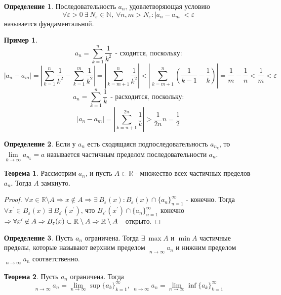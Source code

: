 \documentclass[a4paper, 12pt]{article}
\newcommand{\N}{\mathbb{N}}
\newcommand{\R}{\mathbb{R}}
\renewcommand{\epsilon}{\varepsilon}
\newcommand{\lims}{\lim\limits_{n\to \infty}}
\DeclareMathOperator*\lowlim{\underline{lim}}
\DeclareMathOperator*\uplim{\overline{lim}}
\theoremstyle{definition}
\newtheorem*{definition}{Определение}
\newtheorem*{theorem}{Теорема}
\newtheorem*{example}{Пример}
\begin{document}
        \begin{definition}
            Последовательность $a_n$, удовлетворяющая условию
            \[\forall \epsilon>0\ \exists\ N_{\epsilon}\in \N,\ \forall n,m>N_{\epsilon}: |a_n-a_m|<\epsilon\]
            называется фундаментальной.
        \end{definition} 
        \begin{example}
                \[a_n=\sum\limits_{k=1}^n\frac{1}{k^2}\ \ \text{- сходится, поскольку:}\] 
                \[|a_n-a_m|=|\sum\limits_{k=1}^n\frac{1}{k^2}-\sum\limits_{k=1}^m\frac{1}{k^2}|=|\sum\limits_{k=m+1}^n\frac{1}{k^2}|<|\sum\limits_{k=m+1}^n (\frac{1}{k-1}-\frac{1}{k})|=\frac{1}{m}-\frac{1}{n}<\frac{1}{m}<\epsilon\]
                \[a_n=\sum\limits_{k=1}^n\frac{1}{k}\ \ \text{- расходится, поскольку:}\]
                \[|a_n-a_m|=|\sum\limits_{k=n+1}^{2n}\frac{1}{k}|>\frac{1}{2n}n=\frac{1}{2}\]
        \end{example}
        \begin{definition}
            Если у $a_n$ есть сходящаяся подпоследовательность $a_{n_k}$, то\\ $\lim\limits_{k\to \infty}a_{n_k}=a$ называется частичным пределом последовательности $a_n$.
        \end{definition} 
        \begin{theorem}
            Рассмотрим $a_n$, и пусть $A\subset \R$ - множество всех частичных пределов $a_n$. Тогда $A$ замкнуто.
        \end{theorem} 
        \begin{proof}
            $\forall x\in \R\setminus A \Rightarrow x\not\in A \Rightarrow \exists\ B_{\epsilon}(x): B_{\epsilon}(x)\cap\{a_n\}_{n=1}^{\infty}$ - конечно. Тогда $\forall x^{\prime}\in B_{\epsilon}(x)\ \exists\ B_{\epsilon^{\prime}}(x^{\prime})$, что $B_{\epsilon^{\prime}}(x^{\prime})\cap\{a_n\}_{n=1}^{\infty}$ конечно $\Rightarrow \forall x^{\prime} \not\in A\\ \Rightarrow B_{\epsilon}(x)\subset \R\setminus A\Rightarrow \R\setminus A$ - открыто.
        \end{proof} 
        \begin{definition}
            Пусть $a_n$ ограничена. Тогда $\exists\ \max A$ и $\min A$ частичные пределы, которые называют верхним пределом $\uplim\limits_{n\to \infty}a_n$ и нижним пределом $\lowlim\limits_{n\to \infty}a_n$ соответственно. 
        \end{definition} 
        \begin{theorem}
            Пусть  $a_n$ ограничена. Тогда 
            \[\uplim\limits_{n\to \infty}a_n=\lims \sup\{a_k\}_{k=1}^{\infty},\ \lowlim\limits_{n\to \infty}a_n=\lims \inf\{a_k\}_{k=1}^{\infty}\]
        \end{theorem} 
\end{document}
